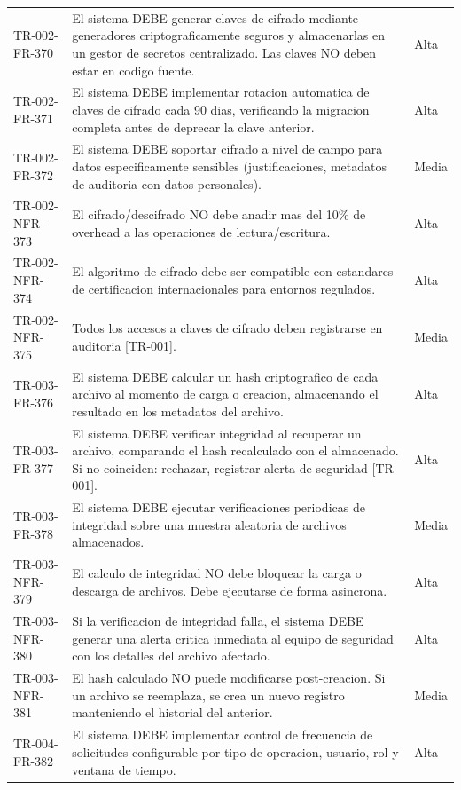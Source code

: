 \begin{longtable}{>{\raggedright\arraybackslash}p{} >{\raggedright\arraybackslash}p{} >{\raggedright\arraybackslash}p{}}
TR-002-FR-370 & El sistema DEBE generar claves de cifrado mediante generadores criptograficamente seguros y almacenarlas en un gestor de secretos centralizado. Las claves NO deben estar en codigo fuente. & Alta \\
TR-002-FR-371 & El sistema DEBE implementar rotacion automatica de claves de cifrado cada 90 dias, verificando la migracion completa antes de deprecar la clave anterior. & Alta \\
TR-002-FR-372 & El sistema DEBE soportar cifrado a nivel de campo para datos especificamente sensibles (justificaciones, metadatos de auditoria con datos personales). & Media \\
TR-002-NFR-373 & El cifrado/descifrado NO debe anadir mas del 10\% de overhead a las operaciones de lectura/escritura. & Alta \\
TR-002-NFR-374 & El algoritmo de cifrado debe ser compatible con estandares de certificacion internacionales para entornos regulados. & Alta \\
TR-002-NFR-375 & Todos los accesos a claves de cifrado deben registrarse en auditoria [TR-001]. & Media \\
TR-003-FR-376 & El sistema DEBE calcular un hash criptografico de cada archivo al momento de carga o creacion, almacenando el resultado en los metadatos del archivo. & Alta \\
TR-003-FR-377 & El sistema DEBE verificar integridad al recuperar un archivo, comparando el hash recalculado con el almacenado. Si no coinciden: rechazar, registrar alerta de seguridad [TR-001]. & Alta \\
TR-003-FR-378 & El sistema DEBE ejecutar verificaciones periodicas de integridad sobre una muestra aleatoria de archivos almacenados. & Media \\
TR-003-NFR-379 & El calculo de integridad NO debe bloquear la carga o descarga de archivos. Debe ejecutarse de forma asincrona. & Alta \\
TR-003-NFR-380 & Si la verificacion de integridad falla, el sistema DEBE generar una alerta critica inmediata al equipo de seguridad con los detalles del archivo afectado. & Alta \\
TR-003-NFR-381 & El hash calculado NO puede modificarse post-creacion. Si un archivo se reemplaza, se crea un nuevo registro manteniendo el historial del anterior. & Media \\
TR-004-FR-382 & El sistema DEBE implementar control de frecuencia de solicitudes configurable por tipo de operacion, usuario, rol y ventana de tiempo. & Alta \\

\end{longtable}
